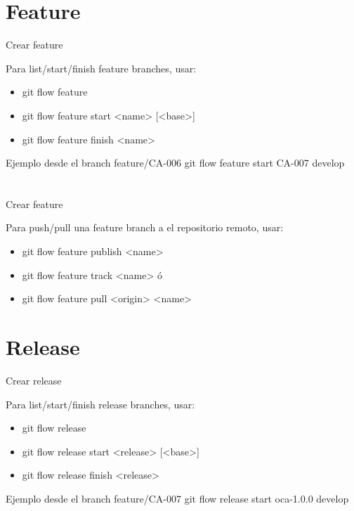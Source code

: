 \documentclass{beamer}
\begin{document}
\section{Feature}
\begin{frame}{Crear feature}

\begin{block}{Para list/start/finish feature branches, usar:}
\begin{itemize}
\item git flow feature
\item git flow feature start <name> [<base>]
\item git flow feature finish <name>
\end{itemize}
\end{block}

\begin{block}{Ejemplo desde el branch feature/CA-006}
git flow feature start CA-007 develop
\end{block}

\end{frame}


\section{}
\begin{frame}{Crear feature}

\begin{block}{Para push/pull una feature branch a el repositorio remoto, usar:}
\begin{itemize}
\item git flow feature publish <name>
\item git flow feature track <name> ó 
\item git flow feature pull <origin> <name>
\end{itemize}
\end{block}

\end{frame}

\section{Release}
\begin{frame}{Crear release}

\begin{block}{Para list/start/finish release branches, usar:}
\begin{itemize}
\item git flow release
\item git flow release start <release> [<base>]
\item git flow release finish <release>
\end{itemize}
\end{block}

\begin{block}{Ejemplo desde el branch feature/CA-007}
git flow release start oca-1.0.0 develop
\end{block}
\end{frame}
\end{document}
